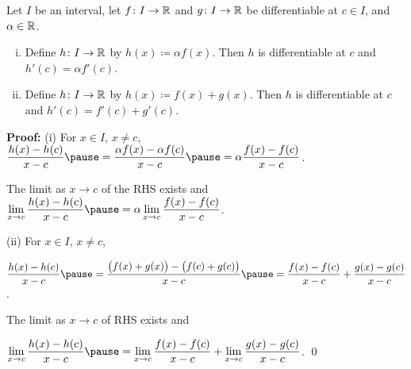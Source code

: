 \documentclass[10pt,aspectratio=149]{beamer}
\begin{document}
\begin{frame}

\begin{proposition}[Linearity]
Let $I$ be an interval, let
$f \colon I \to {\mathbb{R}}$ and $g \colon I \to {\mathbb{R}}$ be differentiable at $c \in I$,
and $\alpha \in {\mathbb{R}}$.%
\begin{enumerate}[(i)]
\item\pause
Define $h \colon I \to {\mathbb{R}}$ by $h(x) \coloneqq \alpha f(x)$.  Then
$h$ is differentiable at $c$ and
$h'(c) = \alpha f'(c)$.
\item\pause
Define $h \colon I \to {\mathbb{R}}$ by $h(x) \coloneqq  f(x) + g(x)$.  Then
$h$ is differentiable at $c$ and
$h'(c) =  f'(c) + g'(c)$.
\end{enumerate}
\end{proposition}

\pause
\textbf{Proof:}
(i) For $x \in I$, $x \not= c$,
\pause
\quad
$\displaystyle
\frac{h(x)-h(c)}{x-c}
\pause
=
\frac{\alpha f(x) - \alpha f(c)}{x-c}
\pause
=
\alpha \frac{f(x) - f(c)}{x-c}$.

\pause
\medskip

The limit as $x \to c$ of the RHS exists
\pause
and
\quad
$\displaystyle
\lim_{x\to c}\frac{h(x)-h(c)}{x-c}
\pause
=
\alpha \lim_{x\to c} \frac{f(x) - f(c)}{x-c}$.

\pause
\medskip

(ii)
For $x \in I$, $x \not= c$,

\pause
\medskip

\quad $\displaystyle
\frac{h(x)-h(c)}{x-c}
\pause
=
\frac{\bigl(f(x) + g(x)\bigr) - \bigl(f(c) + g(c)\bigr)}{x-c}
\pause
=
\frac{f(x) - f(c)}{x-c}
+
\frac{g(x) - g(c)}{x-c}$.

\pause
\medskip

The limit as $x \to c$ of RHS exists
\pause
and

\medskip
\quad $\displaystyle
\lim_{x\to c}\frac{h(x)-h(c)}{x-c}
\pause
=
\lim_{x\to c} \frac{f(x) - f(c)}{x-c}
+
\lim_{x\to c}\frac{g(x) - g(c)}{x-c}$.
\qed

\end{frame}
\end{document}

